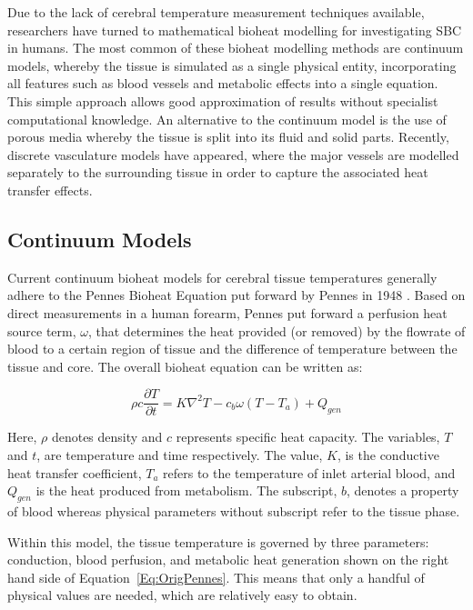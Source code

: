 \documentclass[11pt,english,a4paper,twoside,openright]{report}
\begin{document}
{{{{{{{{	Due to the lack of cerebral temperature measurement techniques available, researchers have turned to mathematical bioheat modelling for investigating SBC in humans. The most common of these bioheat modelling methods are continuum models, whereby the tissue is simulated as a single physical entity, incorporating all features such as blood vessels and metabolic effects into a single equation. This simple approach allows good approximation of results without specialist computational knowledge. An alternative to the continuum model is the use of porous media whereby the tissue is split into its fluid and solid parts. Recently, discrete vasculature models have appeared, where the major vessels are modelled separately to the surrounding tissue in order to capture the associated heat transfer effects.
	
	\subsection{Continuum Models}
	
	Current continuum bioheat models for cerebral tissue temperatures generally adhere to the Pennes Bioheat Equation put forward by Pennes in 1948 \cite{pennes1948analysis}. Based on direct measurements in a human forearm, Pennes put forward a perfusion heat source term, $\omega$, that determines the heat provided (or removed) by the flowrate of blood to a certain region of tissue and the difference of temperature between the tissue and core. The overall bioheat equation can be written as:
	
	\begin{equation}
	\rho c\frac{\partial T}{\partial t} = K\nabla^{2}T - c_{b}\omega(T-T_{a}) + Q_{gen}
	\label{Eq:OrigPennes}
	\end{equation}
	
	Here, $\rho$ denotes density and $c$ represents specific heat capacity. The variables, $T$ and $t$, are temperature and time respectively. The value, $K$, is the conductive heat transfer coefficient, $T_{a}$ refers to the temperature of inlet arterial blood, and $Q_{gen}$ is the heat produced from metabolism. The subscript, $b$, denotes a property of blood whereas physical parameters without subscript refer to the tissue phase. 
	
	Within this model, the tissue temperature is governed by three parameters: conduction, blood perfusion, and metabolic heat generation shown on the right hand side of Equation~\ref{Eq:OrigPennes}. This means that only a handful of physical values are needed, which are relatively easy to obtain. 
	
}}}}}}}}
\end{document}
